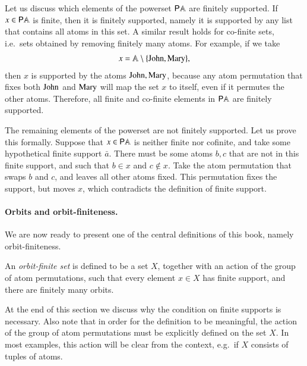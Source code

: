 \begin{myexample}
    Let us discuss which elements of the powerset ${\mathsf P} \mathbb A$ are finitely supported. If $x \in {\mathsf P} \mathbb A$ is finite, then it is finitely  supported, namely it is supported by any list that contains all atoms in this set. A similar result holds for co-finite sets, i.e.~sets obtained by removing finitely many atoms. For example, if we take 
    \begin{align*}
    x = \mathbb A \setminus \{\text{John},\text{Mary}\},
    \end{align*}
    then  $x$ is  supported by the atoms $\text{John},\text{Mary}$, because any atom permutation that fixes both $\text{John}$ and $\text{Mary}$ will map the set $x$ to itself, even if it permutes the other atoms. Therefore, all finite and co-finite elements in ${\mathsf P} \mathbb A$ are finitely supported. 

    The remaining elements of the powerset are not finitely supported.  Let us prove this formally. Suppose that $x \in {\mathsf P} \mathbb A$ is neither finite nor cofinite, and take some hypothetical finite support $\bar a$. There must be some atoms $b,c$ that are not in this finite support, and such that $b \in x$ and $c \not \in x$. Take the atom permutation that swaps $b$ and $c$, and leaves all other atoms fixed. This permutation fixes the support, but moves $x$, which contradicts the definition of finite support.
\end{myexample}

\paragraph*{Orbits and orbit-finiteness.} We are now ready to present one of the central definitions of this book, namely orbit-finiteness. 


\begin{definition}\label{def:orbit-finite-set-equality}
	An \emph{orbit-finite set} is defined to be a set $X$, together with an action of the group of atom permutations, such that every element $x \in X$ has finite support, and there are finitely many orbits. 
\end{definition}

At the end of this section we discuss why the condition on finite supports is necessary. Also note that in order for the definition to be meaningful, the action of the group of atom permutations must be explicitly defined on the set $X$. In most examples, this action will be clear from the context, e.g.~if $X$ consists of tuples of atoms.


